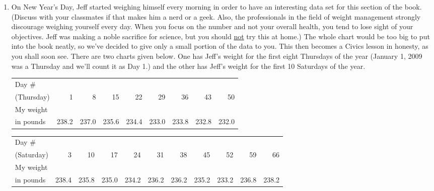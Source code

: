 \begin{enumerate}
\item On New Year's Day, Jeff started weighing himself every morning in order to have an interesting data set for this section of the book.  (Discuss with your classmates if that makes him a nerd or a geek.  Also, the professionals in the field of weight management strongly discourage weighing yourself every day.  When you focus on the number and not your overall health, you tend to lose sight of your objectives. Jeff was making a noble sacrifice for science, but you should \underline{not} try this at home.)  The whole chart would be too big to put into the book neatly, so we've decided to give only a small portion of the data to you.  This then becomes a Civics lesson in honesty, as you shall soon see.  There are two charts given below.  One has Jeff's weight for the first eight Thursdays of the year (January 1, 2009 was a Thursday and we'll count it as Day 1.) and the other has Jeff's weight for the first 10 Saturdays of the year.  

\medskip

\small

\noindent \begin{tabular}{|l|r|r|r|r|r|r|r|r|} \hline
Day \# & & & & & & & &  \\
(Thursday) & 1 & 8 & 15 & 22 & 29 & 36 & 43 & 50 \\ 
\hline 
My weight & & & & & & & & \\
in pounds & 238.2 & 237.0 & 235.6 & 234.4 & 233.0 & 233.8 & 232.8 & 232.0\\ \hline
\end{tabular}

\medskip

\noindent \begin{tabular}{|l|r|r|r|r|r|r|r|r|r|r|} \hline
Day \# & & & & & & & & & & \\
(Saturday) & 3 & 10 & 17 & 24 & 31 & 38 & 45 & 52 & 59 & 66 \\ 
\hline 
My weight & & & & & & & & & & \\
in pounds & 238.4 & 235.8 & 235.0 & 234.2 & 236.2 & 236.2 & 235.2 & 233.2 & 236.8 & 238.2\\ \hline
\end{tabular}

\normalsize

\medskip

\begin{enumerate}


\end{enumerate}
\end{enumerate}
